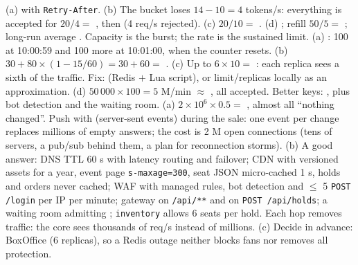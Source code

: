  (a)  with \texttt{Retry-After}. (b) The bucket loses $14 - 10 = 4$ tokens/s: everything is accepted for $20/4 =$ , then  (4 req/s rejected). (c) $20/10 =$ . (d) ; refill $50/5 =$ ; long-run average . Capacity is the burst; the rate is the sustained limit.
 (a) : 100 at 10:00:59 and 100 more at 10:01:00, when the counter resets. (b) $30 + 80 \times (1 - 15/60) = 30 + 60 =$ . (c) Up to $6 \times 10 =$ : each replica sees a sixth of the traffic. Fix:  (Redis $+$ Lua script), or limit/replicas locally as an approximation. (d) $50\,000 \times 100 = 5$ M/min $\approx$ , all accepted. Better keys: , plus bot detection and the waiting room.
 (a) $2 \times 10^6 \times 0.5 =$ , almost all ``nothing changed''. Push with  (server-sent events) during the sale: one event per change replaces millions of empty answers; the cost is 2 M open connections (tens of servers, a pub/sub behind them, a plan for reconnection storms). (b) A good answer: DNS TTL 60 s with latency routing and failover; CDN with versioned assets for a year, event page \texttt{s-maxage=300}, seat JSON micro-cached 1 s, holds and orders never cached; WAF with managed rules, bot detection and $\le$ 5 \texttt{POST /login} per IP per minute; gateway  on \texttt{/api/**} and  on \texttt{POST /api/holds}; a waiting room admitting ; \texttt{inventory} allows 6 seats per hold. Each hop removes traffic: the core sees thousands of req/s instead of millions. (c) Decide in advance: BoxOffice  (6 replicas), so a Redis outage neither blocks fans nor removes all protection.
